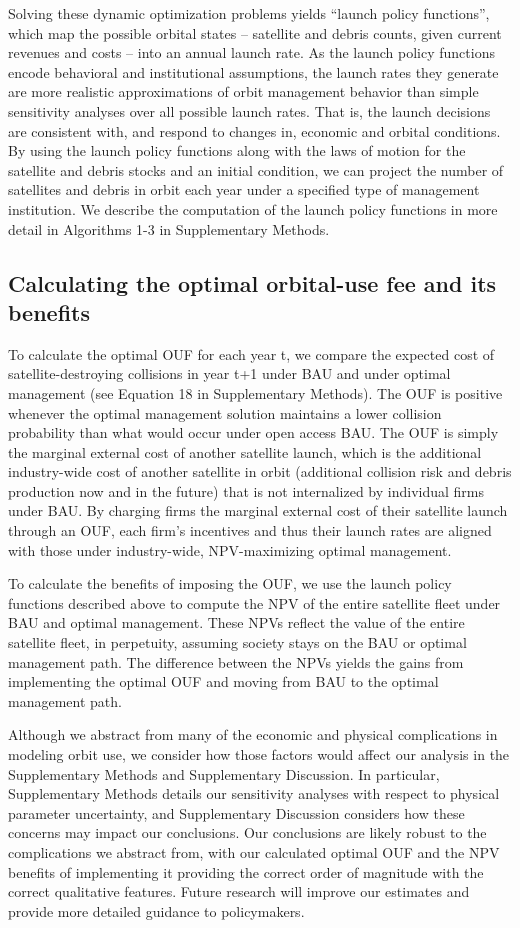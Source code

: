 \documentclass[9pt,twocolumn,twoside,lineno]{pnas-new}
\begin{document}
{	Solving these dynamic optimization problems yields “launch policy functions”, which map the possible orbital states – satellite and debris counts, given current revenues and costs – into an annual launch rate. As the launch policy functions encode behavioral and institutional assumptions, the launch rates they generate are more realistic approximations of orbit management behavior than simple sensitivity analyses over all possible launch rates.  That is, the launch decisions are consistent with, and respond to changes in, economic and orbital conditions. By using the launch policy functions along with the laws of motion for the satellite and debris stocks and an initial condition, we can project the number of satellites and debris in orbit each year under a specified type of management institution. We describe the computation of the launch policy functions in more detail in Algorithms 1-3 in Supplementary Methods. 
	
	\subsection*{Calculating the optimal orbital-use fee and its benefits} To calculate the optimal OUF for each year t, we compare the expected cost of satellite-destroying collisions in year t+1 under BAU and under optimal management (see Equation 18 in Supplementary Methods). The OUF is positive whenever the optimal management solution maintains a lower collision probability than what would occur under open access BAU. The OUF is simply the marginal external cost of another satellite launch, which is the additional industry-wide cost of another satellite in orbit (additional collision risk and debris production now and in the future) that is not internalized by individual firms under BAU. By charging firms the marginal external cost of their satellite launch through an OUF, each firm’s incentives and thus their launch rates are aligned with those under industry-wide, NPV-maximizing optimal management.
	
	To calculate the benefits of imposing the OUF, we use the launch policy functions described above to compute the NPV of the entire satellite fleet under BAU and optimal management. These NPVs reflect the value of the entire satellite fleet, in perpetuity, assuming society stays on the BAU or optimal management path. The difference between the NPVs yields the gains from implementing the optimal OUF and moving from BAU to the optimal management path.
	
	Although we abstract from many of the economic and physical complications in modeling orbit use, we consider how those factors would affect our analysis in the Supplementary Methods and Supplementary Discussion. In particular, Supplementary Methods details our sensitivity analyses with respect to physical parameter uncertainty, and Supplementary Discussion considers how these concerns may impact our conclusions. Our conclusions are likely robust to the complications we abstract from, with our calculated optimal OUF and the NPV benefits of implementing it providing the correct order of magnitude with the correct qualitative features. Future research will improve our estimates and provide more detailed guidance to policymakers.
}
\end{document}
